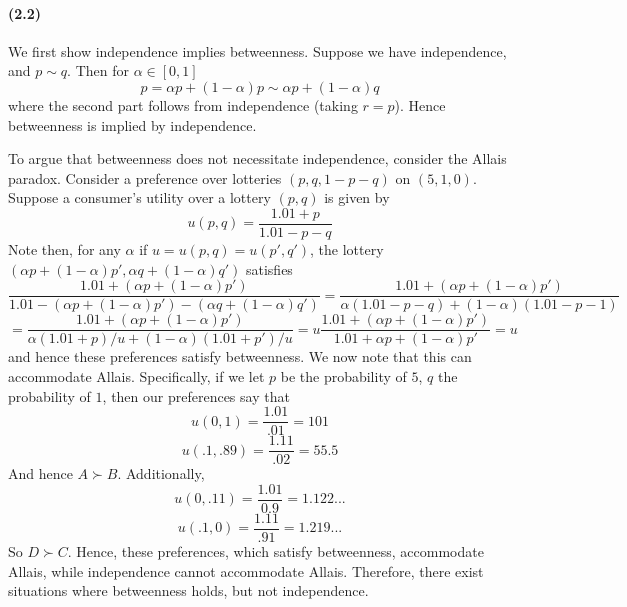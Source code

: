 \documentclass[10pt,letter]{article}
\begin{document}
\paragraph{(2.2)}
We first show independence implies betweenness. Suppose we have independence, and $p \sim q$. Then for $\alpha \in [0,1]$
\[ p = \alpha p + (1-\alpha) p \sim \alpha p + (1-\alpha) q  \]
where the second part follows from independence (taking $r = p$). Hence betweenness is implied by independence.

To argue that betweenness does not necessitate independence, consider the Allais paradox. Consider a preference over lotteries $(p, q, 1-p-q)$ on $(5,1,0)$. Suppose a consumer's utility over a lottery $(p,q)$ is given by
\[u(p,q) = \frac{1.01 + p}{1.01 - p - q}    \]
Note then, for any $\alpha$ if $u = u(p,q) = u(p',q')$, the lottery $ (\alpha p + (1-\alpha) p', \alpha q + (1-\alpha)q' ) $ satisfies
\[ \frac{1.01 + (\alpha p + (1-\alpha)p')}{1.01 - (\alpha p + (1-\alpha) p') - (\alpha q + (1-\alpha)q')} = \frac{1.01+ (\alpha p + (1-\alpha)p')}{\alpha(1.01 - p - q) + (1-\alpha)(1.01-p-1)} \] \[ = \frac{1.01+ (\alpha p + (1-\alpha)p')}{\alpha(1.01 + p)/u + (1-\alpha)(1.01 + p')/u} = u \frac{1.01+(\alpha p + (1-\alpha)p')}{1.01+ \alpha p + (1-\alpha) p'} = u  \]
and hence these preferences satisfy betweenness. We now note that this can accommodate Allais. Specifically, if we let $p$ be the probability of $5$, $q$ the probability of $1$, then our preferences say that
\[ u(0,1) = \frac{1.01}{.01} = 101 \]
\[ u(.1, .89) = \frac{1.11}{.02} = 55.5 \]
And hence $A \succ B$. Additionally,
\[ u(0, .11) =\frac{1.01}{0.9} = 1.122... \]
\[ u(.1, 0) = \frac{1.11}{.91} = 1.219...\]
So $D \succ C$. Hence, these preferences, which satisfy betweenness, accommodate Allais, while independence cannot accommodate Allais. Therefore, there exist situations where betweenness holds, but not independence.
\end{document}
